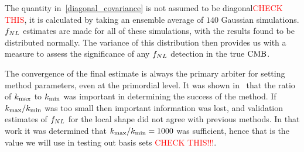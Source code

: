     The quantity in~\eqref{diagonal_covariance} is not assumed to be diagonal\textcolor{red}{CHECK THIS},
    it is calculated by taking an
    ensemble average of $140$ Gaussian simulations. $f_{NL}$ estimates are made for all of these simulations,
    with the results found to be distributed normally. The variance of this distribution then provides us with
    a measure to assess the significance of any $f_{NL}$ detection in the true $\text{CMB}$.


    The convergence of the final estimate is always the primary arbiter for setting method
    parameters, even at the primordial level. It was shown in~\cite{Sohn_2021} that the ratio of ${k_\text{max}}$
    to ${k_\text{min}}$ was important in determining the success of the method. If ${k_\text{max}}/{k_\text{min}}$ was too small
    then important information was lost, and validation estimates of $f_{NL}$ for the local shape
    did not agree with previous methods. In that work it was determined that ${k_\text{max}}/{k_\text{min}}=1000$ was
    sufficient, hence that is the value we will use in testing out basis sets
    \textcolor{red}{CHECK THIS!!!}.






